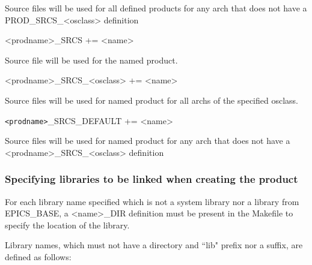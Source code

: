 \begin{description}
Source files will be used for all defined products for any arch that does not have a PROD\_SRCS\_\textless{}osclass\textgreater{} 
definition

\item

\item \textless{}prodname\textgreater{}\_SRCS += \textless{}name\textgreater{}

Source file will be used for the named product.

\item \textless{}prodname\textgreater{}\_SRCS\_\textless{}osclass\textgreater{} += \textless{}name\textgreater{}

Source files will be used for named product for all archs of the specified osclass.

\item \verb|<prodname>|\_SRCS\_DEFAULT += \textless{}name\textgreater{}

Source files will be used for named product for any arch that does not have a \textless{}prodname\textgreater{}\_SRCS\_\textless{}osclass\textgreater{} 
definition

\end{description}

\subsubsection{Specifying libraries to be linked when creating the product}

For each library name specified which is not a system library nor a library from EPICS\_BASE, a \textless{}name\textgreater{}\_DIR definition 
must be present in the Makefile to specify the location of the library. 

Library names, which must not have a directory and ``lib" prefix nor a suffix, are defined as follows:

